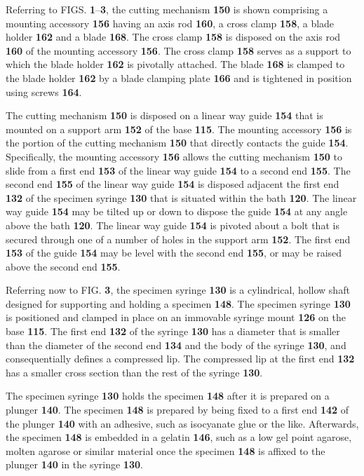 \documentclass{article}
\begin{document}
Referring to FIGS. \textbf{1}–\textbf{3}, the cutting mechanism \textbf{150} is shown comprising a mounting accessory \textbf{156} having an axis rod \textbf{160}, a cross clamp \textbf{158}, a blade holder \textbf{162} and a blade \textbf{168}. The cross clamp \textbf{158} is disposed on the axis rod \textbf{160} of the mounting accessory \textbf{156}. The cross clamp \textbf{158} serves as a support to which the blade holder \textbf{162} is pivotally attached. The blade \textbf{168} is clamped to the blade holder \textbf{162} by a blade clamping plate \textbf{166} and is tightened in position using screws \textbf{164}.

The cutting mechanism \textbf{150} is disposed on a linear way guide \textbf{154} that is mounted on a support arm \textbf{152} of the base  \textbf{115}. The mounting accessory \textbf{156} is the portion of the cutting mechanism \textbf{150} that directly contacts the guide \textbf{154}. Specifically, the mounting accessory \textbf{156} allows the cutting mechanism \textbf{150} to slide from a first end \textbf{153} of the linear way guide \textbf{154} to a second end \textbf{155}. The second end \textbf{155} of the linear way guide \textbf{154} is disposed adjacent the first end \textbf{132} of the specimen syringe \textbf{130} that is situated within the bath \textbf{120}. The linear way guide \textbf{154} may be tilted up or down to dispose the guide \textbf{154} at any angle above the bath \textbf{120}. The linear way guide \textbf{154} is pivoted about a bolt that is secured through one of a number of holes in the support arm \textbf{152}. The first end \textbf{153} of the guide \textbf{154} may be level with the second end \textbf{155}, or may be raised above the second end \textbf{155}.

Referring now to FIG. \textbf{3}, the specimen syringe \textbf{130} is a cylindrical, hollow shaft designed for supporting and holding a specimen \textbf{148}. The specimen syringe \textbf{130} is positioned and clamped in place on an immovable syringe mount \textbf{126} on the base \textbf{115}. The first end \textbf{132} of the syringe \textbf{130} has a diameter that is smaller than the diameter of the second end \textbf{134} and the body of the syringe \textbf{130}, and consequentially defines a compressed lip. The compressed lip at the first end \textbf{132} has a smaller cross section than the rest of the syringe \textbf{130}.

The specimen syringe \textbf{130} holds the specimen \textbf{148} after it is prepared on a plunger \textbf{140}. The specimen \textbf{148} is prepared by being fixed to a first end \textbf{142} of the plunger \textbf{140} with an adhesive, such as isocyanate glue or the like. Afterwards, the specimen \textbf{148} is embedded in a gelatin \textbf{146}, such as a low gel point agarose, molten agarose or similar material once the specimen \textbf{148} is affixed to the plunger \textbf{140} in the syringe \textbf{130}.
\end{document}
